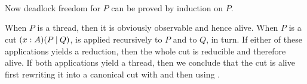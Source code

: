 \begin{code}[hide]
\AgdaSymbol{(}\AgdaSpace{}%
\AgdaSpace{}%
\AgdaSymbol{))}\AgdaSpace{}%
\AgdaSpace{}%
\AgdaSpace{}%
\<%
\\
\>[0]\AgdaSpace{}%
\AgdaSymbol{|}\AgdaSpace{}%
\AgdaSpace{}%
\AgdaSymbol{=}\<%
\\
\>[0][@{}l@{\AgdaIndent{0}}]%
\>[2]\AgdaSpace{}%
\AgdaSymbol{\AgdaUnderscore{}}\AgdaSpace{}%
\AgdaOperator{\AgdaInductiveConstructor{,}}\AgdaSpace{}%
\AgdaSpace{}%
\AgdaOperator{\AgdaInductiveConstructor{,}}\AgdaSpace{}%
\AgdaSpace{}%
\AgdaSymbol{=}\AgdaSpace{}%
\AgdaSpace{}%
\AgdaSpace{}%
\AgdaSpace{}%
\<%
\\
%
\>[2]\AgdaSpace{}%
\AgdaSymbol{(\AgdaUnderscore{}}\AgdaSpace{}%
\AgdaOperator{\AgdaInductiveConstructor{,}}\AgdaSpace{}%
\AgdaSpace{}%
\AgdaSpace{}%
\AgdaSpace{}%
\AgdaSpace{}%
\AgdaSpace{}%
\AgdaSpace{}%
\AgdaOperator{\AgdaInductiveConstructor{,}}\AgdaSpace{}%
\AgdaSpace{}%
\AgdaSpace{}%
\AgdaSymbol{(}\AgdaSpace{}%
\AgdaSymbol{(}\AgdaSpace{}%
\AgdaSpace{}%
\AgdaSpace{}%
\AgdaSpace{}%
\AgdaSymbol{)))}\<%
\end{code}

Now deadlock freedom for $P$ can be proved by induction on $P$.

\begin{code}%
\>[0]\AgdaSpace{}%
\AgdaSymbol{:}\AgdaSpace{}%
\AgdaSymbol{\}}\AgdaSpace{}%
\AgdaSymbol{(}\AgdaSpace{}%
\AgdaSymbol{:}\AgdaSpace{}%
\AgdaSpace{}%
\AgdaSymbol{)}\AgdaSpace{}%
\AgdaSpace{}%
\AgdaSpace{}%
\<%
\end{code}

When $P$ is a thread, then it is obviously observable and hence alive. When $P$
is a cut $\Cut[A]\x{P}{Q}$,  is applied
recursively to $P$ and to $Q$, in turn. If either of these applications yields a
reduction, then the whole cut is reducible and therefore alive. If both
applications yield a thread, then we conclude that the cut is alive first
rewriting it into a canonical cut with  and then
using .

